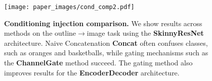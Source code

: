 




\begin{figure}[t]
    \centering
    \texttt{[image: paper\_images/cond\_comp2.pdf]}
    \caption{{\bf Conditioning injection comparison.} We show results across methods on the outline$\rightarrow$image task using the \textbf{SkinnyResNet} architecture. Naive Concatenation \textbf{Concat} often confuses classes, such as oranges and basketballs, while gating mechanisms such as the \textbf{ChannelGate} method succeed. The gating method also improves results for the \textbf{EncoderDecoder} architecture. \label{fig:alg_comp} }
    \vspace{-4mm}
\end{figure}


